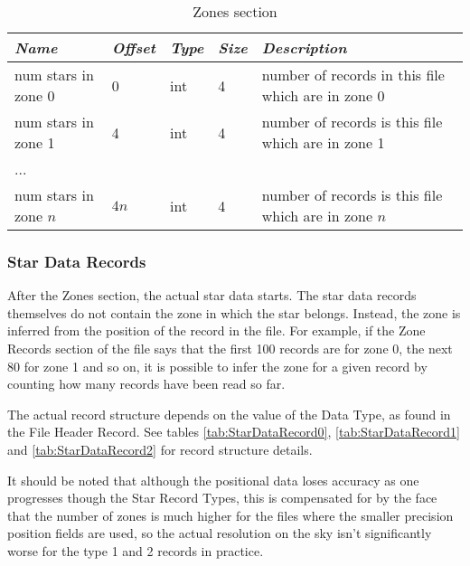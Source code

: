 \begin{table}[htbp]
\begin{tabularx}{\textwidth}{llllX}\toprule
\emph{Name} & \emph{Offset} & \emph{Type} & \emph{Size} &\emph{Description}\\\midrule
num stars in zone 0   & 0    & int & 4 &  number of records in this file which are in zone 0\\%
num stars in zone 1   & 4    & int & 4 &  number of records is this file which are in zone 1\\
...                   &      &     &   &\\
num stars in zone $n$ & $4n$ & int & 4 &  number of records is this file which are in zone $n$\\\bottomrule
\end{tabularx}
\caption{Zones section}
\label{tab:Catalogues:stars:record:zones}
\end{table}

\subsubsection{Star Data Records}%
\label{sec:Catalogues:stars:record:data}

After the Zones section, the actual star data starts. The star data
records themselves do not contain the zone in which the star belongs.
Instead, the zone is inferred from the position of the record in the
file. For example, if the Zone Records section of the file says that the
first 100 records are for zone 0, the next 80 for zone 1 and so on, it
is possible to infer the zone for a given record by counting how many
records have been read so far.

The actual record structure depends on the value of the Data Type, as
found in the File Header Record.
See tables 
\ref{tab:StarDataRecord0}, \ref{tab:StarDataRecord1} and \ref{tab:StarDataRecord2}
for record structure details.

It should be noted that although the positional data loses accuracy as
one progresses though the Star Record Types, this is compensated for by
the face that the number of zones is much higher for the files where the
smaller precision position fields are used, so the actual resolution on
the sky isn't significantly worse for the type 1 and 2 records in
practice.

